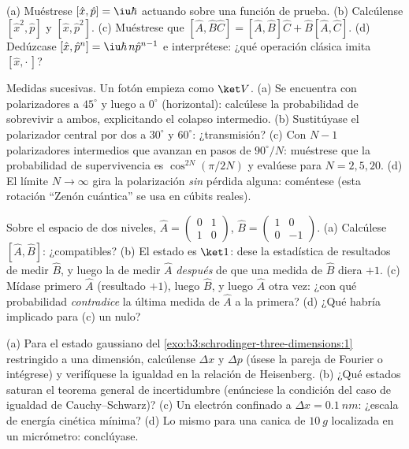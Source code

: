 \begin{exercise}[$\star$]\label{exo:b3:quantum-formalism:4}
(a) Muéstrese $[\hat x, \hat p] = \iu\hbar$ actuando sobre una función de
prueba. (b) Calcúlense $[\hat x^2, \hat p]$ y $[\hat x, \hat p^2]$. (c)
Muéstrese que $[\hat A, \hat B\hat C] = [\hat A, \hat B]\hat C + \hat B[\hat A,
\hat C]$. (d) Dedúzcase $[\hat x, \hat p^n] = \iu\hbar\,n\hat p^{n-1}$
e interprétese: ¿qué operación clásica imita $[\hat x, \cdot\,]$?
\end{exercise}

\begin{exercise}[$\star\star$]\label{exo:b3:quantum-formalism:5}
Medidas sucesivas. Un fotón empieza como $\ket V$. (a) Se encuentra con
polarizadores a $45^\circ$ y luego a $0^\circ$ (horizontal): calcúlese la
probabilidad de sobrevivir a ambos, explicitando el colapso intermedio. (b)
Sustitúyase el polarizador central por dos a $30^\circ$ y
$60^\circ$: ¿transmisión? (c) Con $N - 1$ polarizadores intermedios que
avanzan en pasos de $90^\circ/N$: muéstrese que la probabilidad de
supervivencia es $\cos^{2N}(\pi/2N)$ y evalúese para $N = 2, 5, 20$. (d) El
límite $N \to \infty$ gira la polarización \emph{sin} pérdida alguna:
coméntese (esta rotación ``Zenón cuántica'' se usa en cúbits reales).
\end{exercise}

\begin{exercise}[$\star\star$]\label{exo:b3:quantum-formalism:6}
Sobre el espacio de dos niveles, $\hat A = \begin{pmatrix}0&1\\1&0
\end{pmatrix}$, $\hat B = \begin{pmatrix}1&0\\0&-1\end{pmatrix}$.
(a) Calcúlese $[\hat A, \hat B]$: ¿compatibles? (b) El estado es
$\ket1$: dese la estadística de resultados de medir $\hat B$, y luego la de
medir $\hat A$ \emph{después} de que una medida de $\hat B$ diera $+1$.
(c) Mídase primero $\hat A$ (resultado $+1$), luego $\hat B$, y luego
$\hat A$ otra vez: ¿con qué probabilidad \emph{contradice} la última
medida de $\hat A$ a la primera? (d) ¿Qué habría implicado para (c) un
 nulo?
\end{exercise}

\begin{exercise}[$\star\star$]\label{exo:b3:quantum-formalism:7}
(a) Para el estado gaussiano del
\cref{exo:b3:schrodinger-three-dimensions:1} restringido a una
dimensión, calcúlense $\Delta x$ y $\Delta p$ (úsese la pareja de Fourier o
intégrese) y verifíquese la igualdad en la relación de Heisenberg. (b) ¿Qué
estados saturan el teorema general de incertidumbre (enúnciese la condición
del caso de igualdad de Cauchy--Schwarz)? (c) Un electrón confinado a
$\Delta x = \qty{0.1}{nm}$: ¿escala de energía cinética mínima? (d) Lo mismo
para una canica de $\qty{10}{g}$ localizada en un micrómetro: conclúyase.
\end{exercise}

